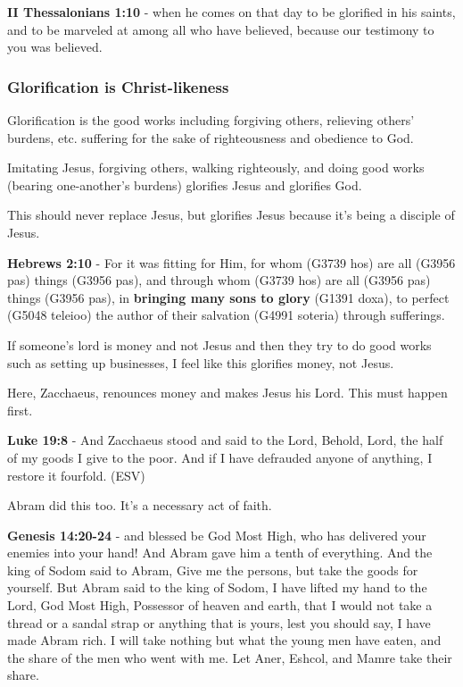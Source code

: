 \documentclass[11pt]{article}
\begin{document}
\textbf{II Thessalonians 1:10} - when he comes on that day to be glorified in his saints, and to be marveled at among all who have believed, because our testimony to you was believed.

\subsubsection{Glorification is Christ-likeness}
\label{sec:org55b747e}
Glorification is the good works including forgiving others, relieving others' burdens, etc. suffering for the sake of righteousness and obedience to God.

Imitating Jesus, forgiving others, walking righteously, and doing good works (bearing one-another's burdens) glorifies Jesus and glorifies God.

This should never replace Jesus, but glorifies Jesus because it's being a disciple of Jesus.

\textbf{Hebrews 2:10} - For it was fitting for Him, for whom (G3739 hos) are all (G3956 pas) things (G3956 pas), and through whom (G3739 hos) are all (G3956 pas) things (G3956 pas), in \textbf{bringing many sons to glory} (G1391 doxa), to perfect (G5048 teleioo) the author of their salvation (G4991 soteria) through sufferings.

If someone's lord is money and not Jesus and then they try to do good works such as setting up businesses, I feel like this glorifies money, not Jesus.

Here, Zacchaeus, renounces money and makes Jesus his Lord. This must happen first.

\textbf{Luke 19:8} - And Zacchaeus stood and said to the Lord, Behold, Lord, the half of my goods I give to the poor. And if I have defrauded anyone of anything, I restore it fourfold. (ESV)

Abram did this too. It's a necessary act of faith.

\textbf{Genesis 14:20-24} - and blessed be God Most High, who has delivered your enemies into your hand! And Abram gave him a tenth of everything. And the king of Sodom said to Abram, Give me the persons, but take the goods for yourself. But Abram said to the king of Sodom, I have lifted my hand to the Lord, God Most High, Possessor of heaven and earth, that I would not take a thread or a sandal strap or anything that is yours, lest you should say, I have made Abram rich. I will take nothing but what the young men have eaten, and the share of the men who went with me. Let Aner, Eshcol, and Mamre take their share.
\end{document}
